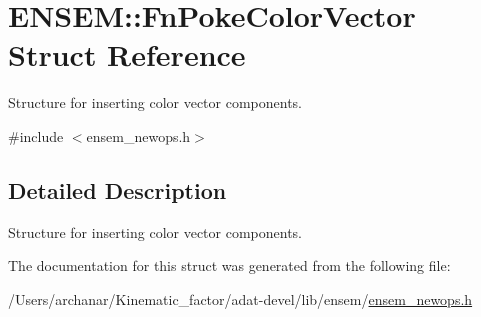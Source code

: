 \hypertarget{structENSEM_1_1FnPokeColorVector}{}\section{E\+N\+S\+EM\+:\+:Fn\+Poke\+Color\+Vector Struct Reference}
\label{structENSEM_1_1FnPokeColorVector}


Structure for inserting color vector components.  




{\ttfamily \#include $<$ensem\+\_\+newops.\+h$>$}



\subsection{Detailed Description}
Structure for inserting color vector components. 

The documentation for this struct was generated from the following file\+:\begin{DoxyCompactItemize}
\item 
/\+Users/archanar/\+Kinematic\+\_\+factor/adat-\/devel/lib/ensem/\mbox{\hyperlink{adat-devel_2lib_2ensem_2ensem__newops_8h}{ensem\+\_\+newops.\+h}}\end{DoxyCompactItemize}
